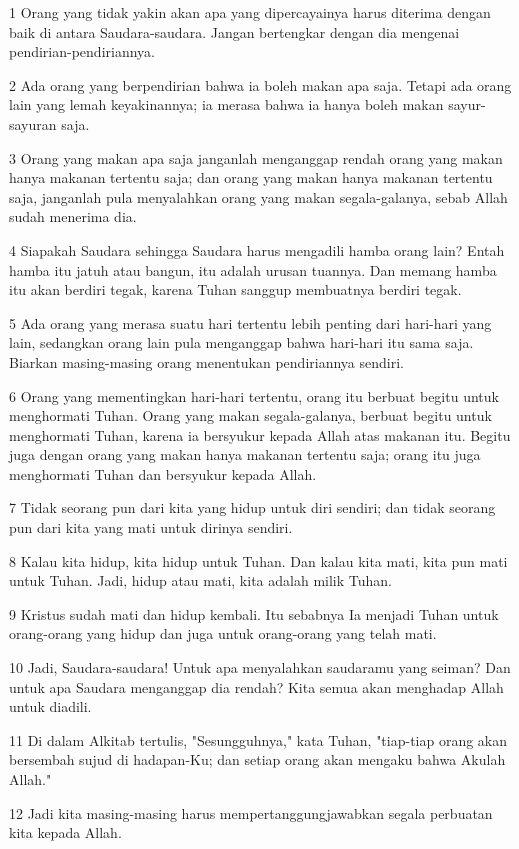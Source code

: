 \par 1 Orang yang tidak yakin akan apa yang dipercayainya harus diterima dengan baik di antara Saudara-saudara. Jangan bertengkar dengan dia mengenai pendirian-pendiriannya.
\par 2 Ada orang yang berpendirian bahwa ia boleh makan apa saja. Tetapi ada orang lain yang lemah keyakinannya; ia merasa bahwa ia hanya boleh makan sayur-sayuran saja.
\par 3 Orang yang makan apa saja janganlah menganggap rendah orang yang makan hanya makanan tertentu saja; dan orang yang makan hanya makanan tertentu saja, janganlah pula menyalahkan orang yang makan segala-galanya, sebab Allah sudah menerima dia.
\par 4 Siapakah Saudara sehingga Saudara harus mengadili hamba orang lain? Entah hamba itu jatuh atau bangun, itu adalah urusan tuannya. Dan memang hamba itu akan berdiri tegak, karena Tuhan sanggup membuatnya berdiri tegak.
\par 5 Ada orang yang merasa suatu hari tertentu lebih penting dari hari-hari yang lain, sedangkan orang lain pula menganggap bahwa hari-hari itu sama saja. Biarkan masing-masing orang menentukan pendiriannya sendiri.
\par 6 Orang yang mementingkan hari-hari tertentu, orang itu berbuat begitu untuk menghormati Tuhan. Orang yang makan segala-galanya, berbuat begitu untuk menghormati Tuhan, karena ia bersyukur kepada Allah atas makanan itu. Begitu juga dengan orang yang makan hanya makanan tertentu saja; orang itu juga menghormati Tuhan dan bersyukur kepada Allah.
\par 7 Tidak seorang pun dari kita yang hidup untuk diri sendiri; dan tidak seorang pun dari kita yang mati untuk dirinya sendiri.
\par 8 Kalau kita hidup, kita hidup untuk Tuhan. Dan kalau kita mati, kita pun mati untuk Tuhan. Jadi, hidup atau mati, kita adalah milik Tuhan.
\par 9 Kristus sudah mati dan hidup kembali. Itu sebabnya Ia menjadi Tuhan untuk orang-orang yang hidup dan juga untuk orang-orang yang telah mati.
\par 10 Jadi, Saudara-saudara! Untuk apa menyalahkan saudaramu yang seiman? Dan untuk apa Saudara menganggap dia rendah? Kita semua akan menghadap Allah untuk diadili.
\par 11 Di dalam Alkitab tertulis, "Sesungguhnya," kata Tuhan, "tiap-tiap orang akan bersembah sujud di hadapan-Ku; dan setiap orang akan mengaku bahwa Akulah Allah."
\par 12 Jadi kita masing-masing harus mempertanggungjawabkan segala perbuatan kita kepada Allah.
